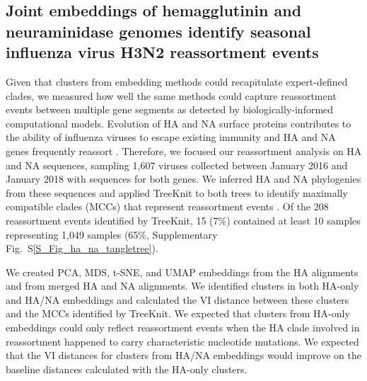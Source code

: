 \documentclass[webpdf,contemporary,large,single]{oup-authoring-template}%
\theoremstyle{thmstyleone}%
\theoremstyle{thmstyletwo}%
\theoremstyle{thmstylethree}%
\begin{document}
\subsection{Joint embeddings of hemagglutinin and neuraminidase genomes identify seasonal influenza virus H3N2 reassortment events}

Given that clusters from embedding methods could recapitulate expert-defined clades, we measured how well the same methods could capture reassortment events between multiple gene segments as detected by biologically-informed computational models.
Evolution of HA and NA surface proteins contributes to the ability of influenza viruses to escape existing immunity \citep{Petrova2018} and HA and NA genes frequently reassort \citep{Nelson2008,Marshall2013,Potter2019}.
Therefore, we focused our reassortment analysis on HA and NA sequences, sampling 1,607 viruses collected between January 2016 and January 2018 with sequences for both genes.
We inferred HA and NA phylogenies from these sequences and applied TreeKnit to both trees to identify maximally compatible clades (MCCs) that represent reassortment events \citep{Barrat-Charlaix2022}.
Of the 208 reassortment events identified by TreeKnit, 15 (7\%) contained at least 10 samples representing 1,049 samples (65\%, Supplementary Fig.~S\ref{S_Fig_ha_na_tangletree}).

We created PCA, MDS, t-SNE, and UMAP embeddings from the HA alignments and from merged HA and NA alignments.
We identified clusters in both HA-only and HA/NA embeddings and calculated the VI distance between these clusters and the MCCs identified by TreeKnit.
We expected that clusters from HA-only embeddings could only reflect reassortment events when the HA clade involved in reassortment happened to carry characteristic nucleotide mutations.
We expected that the VI distances for clusters from HA/NA embeddings would improve on the baseline distances calculated with the HA-only clusters.
\end{document}
